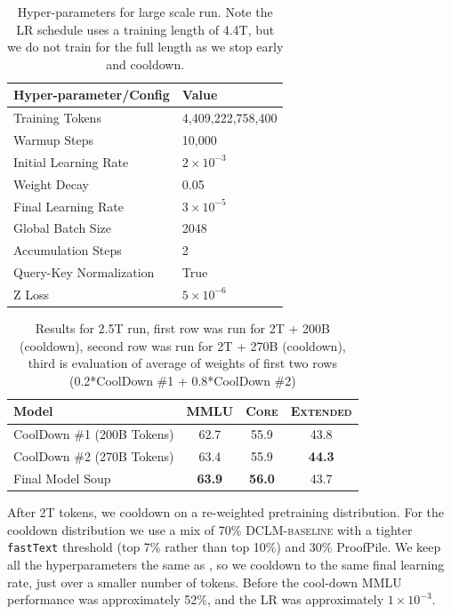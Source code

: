 \documentclass{article}
\newcommand{\hqpool}{\textsc{DCLM-baseline}\xspace}
\newcommand{\fasttext}{\texttt{fastText}\xspace}
\newcommand{\lowvar}{\textsc{Core}\xspace}
\newcommand{\aggscore}{\textsc{Extended}\xspace}
\begin{document}
\begin{table}[t]
    \centering
    \caption{Hyper-parameters for large scale run. Note the LR schedule uses a training length of 4.4T, but we do not train for the full length as we stop early and cooldown.}
    \begin{tabular}{ll}
        \toprule
        Hyper-parameter/Config & Value \\
        \midrule
        Training Tokens &  4,409,222,758,400  \\
        Warmup Steps & 10,000 \\
        Initial Learning Rate & $2\times 10^{-3}$ \\
        Weight Decay & 0.05 \\
        Final Learning Rate  & $3 \times 10^{-5}$ \\
        Global Batch Size & 2048 \\
        Accumulation Steps & 2 \\
        Query-Key Normalization & True \\
        Z Loss & $5 \times 10^{-6}$ \\
        \bottomrule
    \end{tabular}

    \label{tab:hyperparameters}
\end{table}

\begin{table}[t]
\centering
\caption{Results for 2.5T run, first row was run for 2T + 200B (cooldown), second row was run for 2T + 270B (cooldown), third is evaluation of average of weights of first two rows (0.2*CoolDown \#1 + 0.8*CoolDown \#2)}
\begin{tabular}{lccc}
\toprule
Model & MMLU & \lowvar & \aggscore \\
\midrule
CoolDown \#1 (200B Tokens) & 62.7 & 55.9 & 43.8 \\
CoolDown \#2 (270B Tokens) & 63.4 & 55.9 & \textbf{44.3} \\
Final Model Soup & \textbf{63.9} & \textbf{56.0} & 43.7 \\\bottomrule
\end{tabular}

\label{tab:hero_run_full}
\end{table}


After 2T tokens, we cooldown on a re-weighted pretraining distribution. For the cooldown distribution we use a mix of 70\% \hqpool with a tighter \fasttext threshold (top 7\% rather than top 10\%) and 30\% ProofPile.  We keep all the hyperparameters the same as , so we cooldown to the same final learning rate, just over a smaller number of tokens. Before the cool-down MMLU performance was approximately 52\%, and the LR was approximately $1 \times 10^{-3}$.
\end{document}
